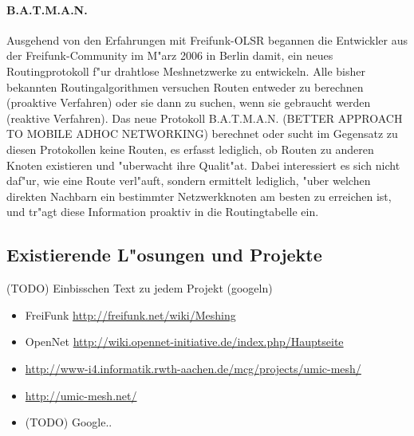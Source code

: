 \paragraph{B.A.T.M.A.N.}

Ausgehend von den Erfahrungen mit Freifunk-OLSR begannen die Entwickler
aus der Freifunk-Community im M"arz 2006 in Berlin damit, ein neues
Routingprotokoll f"ur drahtlose Meshnetzwerke zu entwickeln. Alle bisher
bekannten Routingalgorithmen versuchen Routen entweder zu berechnen
(proaktive Verfahren) oder sie dann zu suchen, wenn sie gebraucht werden
(reaktive Verfahren). Das neue Protokoll B.A.T.M.A.N. 
(BETTER APPROACH TO MOBILE ADHOC NETWORKING) berechnet oder
sucht im Gegensatz zu diesen Protokollen keine Routen, es erfasst
lediglich, ob Routen zu anderen Knoten existieren und "uberwacht ihre
Qualit"at. Dabei interessiert es sich nicht daf"ur, wie eine Route verl"auft,
sondern ermittelt lediglich, "uber welchen direkten Nachbarn ein bestimmter
Netzwerkknoten am besten zu erreichen ist, und tr"agt diese Information
proaktiv in die Routingtabelle ein. 


\subsection{Existierende L"osungen und Projekte}

(TODO) Einbisschen Text zu jedem Projekt (googeln)

\begin{itemize}
\item FreiFunk \url{http://freifunk.net/wiki/Meshing}
\item OpenNet \url{http://wiki.opennet-initiative.de/index.php/Hauptseite}
\item \url{http://www-i4.informatik.rwth-aachen.de/mcg/projects/umic-mesh/} 
\item \url{http://umic-mesh.net/}
\item (TODO) Google..

\end{itemize}
